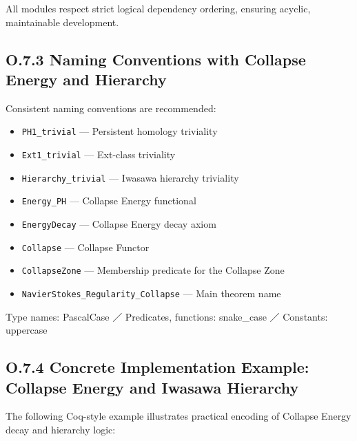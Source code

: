 \documentclass[11pt]{article}
\begin{document}
All modules respect strict logical dependency ordering, ensuring acyclic, maintainable development.

\subsection*{O.7.3 Naming Conventions with Collapse Energy and Hierarchy}

Consistent naming conventions are recommended:

\begin{itemize}
  \item \texttt{PH1\_trivial} — Persistent homology triviality
  \item \texttt{Ext1\_trivial} — Ext-class triviality
  \item \texttt{Hierarchy\_trivial} — Iwasawa hierarchy triviality
  \item \texttt{Energy\_PH} — Collapse Energy functional
  \item \texttt{EnergyDecay} — Collapse Energy decay axiom
  \item \texttt{Collapse} — Collapse Functor
  \item \texttt{CollapseZone} — Membership predicate for the Collapse Zone
  \item \texttt{NavierStokes\_Regularity\_Collapse} — Main theorem name
\end{itemize}

Type names: PascalCase ／ Predicates, functions: snake\_case ／ Constants: uppercase

\subsection*{O.7.4 Concrete Implementation Example: Collapse Energy and Iwasawa Hierarchy}

The following Coq-style example illustrates practical encoding of Collapse Energy decay and hierarchy logic:
\end{document}
